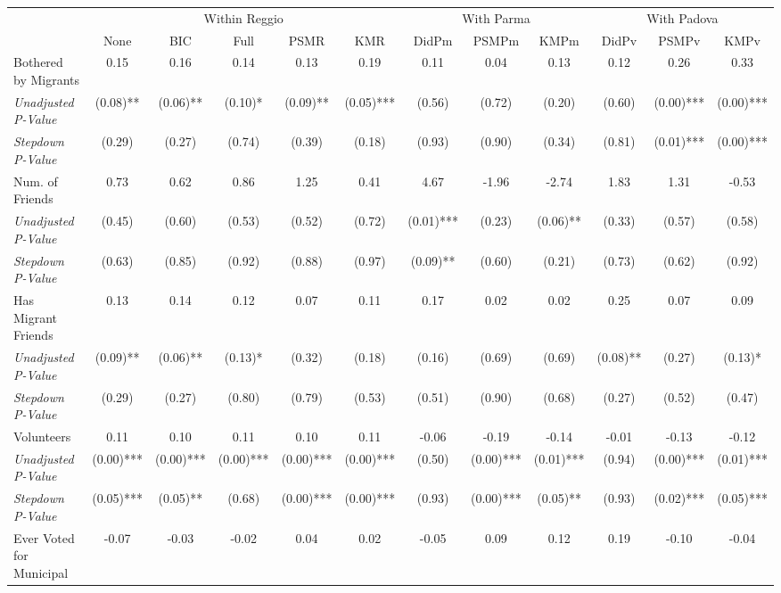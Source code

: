 \begin{tabular}{l c c c c c c c c c c c}
\toprule
& \multicolumn{5}{c}{Within Reggio} & \multicolumn{3}{c}{With Parma} & \multicolumn{3}{c}{With Padova} \\\cmidrule(lr){2-6} \cmidrule(lr){7-9} \cmidrule(lr){10-12}
 & None & BIC & Full & PSMR & KMR & DidPm & PSMPm & KMPm & DidPv & PSMPv & KMPv \\
\midrule
Bothered by Migrants & 0.15 & 0.16 & 0.14 & 0.13 & 0.19 & 0.11 & 0.04 & 0.13 & 0.12 & 0.26 & 0.33 \\
\quad \textit{Unadjusted P-Value} & (0.08)** & (0.06)** & (0.10)* & (0.09)** & (0.05)*** & (0.56) & (0.72) & (0.20) & (0.60) & (0.00)*** & (0.00)*** \\
\quad \textit{Stepdown P-Value} & (0.29) & (0.27) & (0.74) & (0.39) & (0.18) & (0.93) & (0.90) & (0.34) & (0.81) & (0.01)*** & (0.00)*** \\
Num. of Friends & 0.73 & 0.62 & 0.86 & 1.25 & 0.41 & 4.67 & -1.96 & -2.74 & 1.83 & 1.31 & -0.53 \\
\quad \textit{Unadjusted P-Value} & (0.45) & (0.60) & (0.53) & (0.52) & (0.72) & (0.01)*** & (0.23) & (0.06)** & (0.33) & (0.57) & (0.58) \\
\quad \textit{Stepdown P-Value} & (0.63) & (0.85) & (0.92) & (0.88) & (0.97) & (0.09)** & (0.60) & (0.21) & (0.73) & (0.62) & (0.92) \\
Has Migrant Friends & 0.13 & 0.14 & 0.12 & 0.07 & 0.11 & 0.17 & 0.02 & 0.02 & 0.25 & 0.07 & 0.09 \\
\quad \textit{Unadjusted P-Value} & (0.09)** & (0.06)** & (0.13)* & (0.32) & (0.18) & (0.16) & (0.69) & (0.69) & (0.08)** & (0.27) & (0.13)* \\
\quad \textit{Stepdown P-Value} & (0.29) & (0.27) & (0.80) & (0.79) & (0.53) & (0.51) & (0.90) & (0.68) & (0.27) & (0.52) & (0.47) \\
Volunteers & 0.11 & 0.10 & 0.11 & 0.10 & 0.11 & -0.06 & -0.19 & -0.14 & -0.01 & -0.13 & -0.12 \\
\quad \textit{Unadjusted P-Value} & (0.00)*** & (0.00)*** & (0.00)*** & (0.00)*** & (0.00)*** & (0.50) & (0.00)*** & (0.01)*** & (0.94) & (0.00)*** & (0.01)*** \\
\quad \textit{Stepdown P-Value} & (0.05)*** & (0.05)** & (0.68) & (0.00)*** & (0.00)*** & (0.93) & (0.00)*** & (0.05)** & (0.93) & (0.02)*** & (0.05)*** \\
Ever Voted for Municipal & -0.07 & -0.03 & -0.02 & 0.04 & 0.02 & -0.05 & 0.09 & 0.12 & 0.19 & -0.10 & -0.04 \\

\end{tabular}
